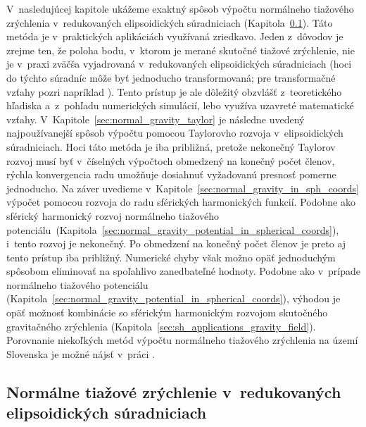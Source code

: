\documentclass[a4paper, 12pt]{book}
\begin{document}
V~nasledujúcej kapitole ukážeme exaktný spôsob výpočtu normálneho tiažového 
zrýchlenia v~redukovaných elipsoidických súradniciach 
(Kapitola~\ref{sec:normal_gravity_in_reduced_ell_coords}).  Táto metóda je 
v~praktických aplikáciách využívaná zriedkavo.  Jeden z~dôvodov je zrejme ten, 
že poloha bodu, v~ktorom je merané skutočné tiažové zrýchlenie, nie je v~praxi 
zväčša vyjadrovaná v~redukovaných elipsoidických súradniciach (hoci do týchto 
súradníc môže byť jednoducho transformovaná; pre transformačné vzťahy pozri 
napríklad \cite{MoritzPhysicalGeodesy}).  Tento prístup je ale dôležitý 
obzvlášť z~teoretického hľadiska a~z~pohľadu numerických simulácií, lebo 
využíva uzavreté matematické vzťahy.  
V~Kapitole~\ref{sec:normal_gravity_taylor} je následne uvedený najpoužívanejší 
spôsob výpočtu pomocou Taylorovho rozvoja v~elipsoidických súradniciach.  Hoci 
táto metóda je iba približná, pretože nekonečný Taylorov rozvoj musí byť 
v~číselných výpočtoch obmedzený na konečný počet členov, rýchla konvergencia 
radu umožňuje dosiahnuť vyžadovanú presnosť pomerne jednoducho.  Na záver 
uvedieme v~Kapitole~\ref{sec:normal_gravity_in_sph_coords} výpočet pomocou 
rozvoja do radu sférických harmonických funkcií.  Podobne ako sférický 
harmonický rozvoj normálneho tiažového 
potenciálu~(Kapitola~\ref{sec:normal_gravity_potential_in_spherical_coords}), 
i~tento rozvoj je nekonečný.  Po obmedzení na konečný počet členov je preto aj
tento prístup iba približný.  Numerické chyby však možno opäť jednoduchým 
spôsobom eliminovať na spoľahlivo zanedbateľné hodnoty.  Podobne ako v~prípade 
normálneho tiažového potenciálu 
(Kapitola~\ref{sec:normal_gravity_potential_in_spherical_coords}), výhodou je 
opäť možnosť kombinácie so sférickým harmonickým rozvojom skutočného 
gravitačného zrýchlenia (Kapitola~\ref{sec:sh_applications_gravity_field}).  
Porovnanie niekoľkých metód výpočtu normálneho tiažového zrýchlenia na území 
Slovenska je možné nájsť v~práci \textcite{Vajda2005}.



\subsection{Normálne tiažové zrýchlenie v~redukovaných elipsoidických 
súradniciach}
\label{sec:normal_gravity_in_reduced_ell_coords}
\end{document}
